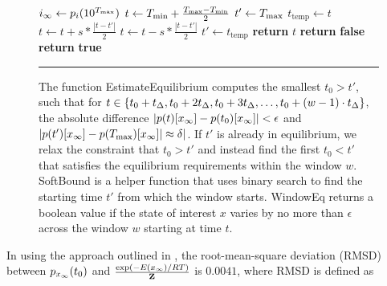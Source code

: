 \documentclass[11pt, oneside]{Thesis} %
\providecommand{\DIFaddbeginFL}{} %
\providecommand{\DIFaddendFL}{} %
\providecommand{\DIFdelbeginFL}{} %
\providecommand{\DIFdelendFL}{} %
\begin{document}
\begin{figure}[!ht]
\begin{algorithmic}[1]
\State $i_{\infty} \gets p_i(10^{T_{\max}})$
\DIFdelbeginFL %
\DIFdelendFL \DIFaddbeginFL {}
\DIFaddendFL \State $t \gets T_{\min} + \frac{T_{\max} - T_{\min}}{2}$
\State $t' \gets T_{\max}$
\State $t_{\text{temp}} \gets t$
\State $t \gets t + s * \frac{|t - t'|}{2}$
\DIFdelbeginFL %
\DIFdelendFL \DIFaddbeginFL {}
\DIFaddendFL \Else
\State $t \gets t - s * \frac{|t - t'|}{2}$
\EndIf
\State $t' \gets t_{\text{temp}}$
\EndWhile
\State \textbf{return} $t$
\EndFunction
{}
\State \textbf{return} \textbf{false}
\EndIf
\EndFor
\State \textbf{return} \textbf{true}
\EndFunction
\rule[-0.35ex]{0pt}{0pt}
\end{algorithmic}
\caption[Pseudocode for estimating equilibrium time]{The function {\sc EstimateEquilibrium} computes the smallest $t_0 > t'$,
such that for $t \in \{t_0+t_{\Delta},t_0+2t_{\Delta},t_0+3t_{\Delta},\dots,t_0+(w-1)\cdot t_{\Delta}\}$,
the absolute difference $|p(t)[x_\infty] - p(t_0)[x_\infty]| < \epsilon$ and
$|p(t')[x_\infty] - p(T_{\max})[x_\infty]| \approx \delta|$. If $t'$ is already in
equilibrium, we relax the constraint that $t_0 > t'$ and instead find the
first $t_0 < t'$ that satisfies the equilibrium requirements within the window
$w$. {\sc SoftBound} is a helper function that uses binary search to find the
starting time $t'$ from which the window starts. {\sc WindowEq} returns a
boolean value if the state of interest $x$ varies by no more than $\epsilon$
across the window $w$ starting at time $t$.}
\label{fig:hermes:eqEst}
\rule[0ex]{0pt}{1.5em} \hrule
\end{figure}

In using the approach outlined in , the root-mean-square
deviation (RMSD)
between $p_{x_\infty}(t_0)$ and $\frac{\exp(-E(x_\infty)/RT)}{{\bf Z}^{}_{}}$ is $0.0041$, where
RMSD is defined as
\end{document}
